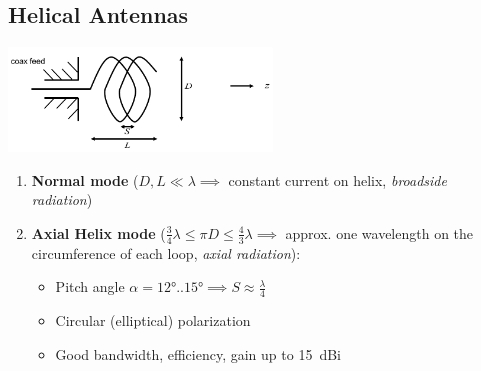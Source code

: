 \subsection{Helical Antennas}
\includegraphics[width=7cm]{content/aawp/pictures/helical_antenna.png}\\
\begin{enumerate}
    \item \textbf{Normal mode} (\(D, L \ll \lambda \implies\) constant current on helix, \textit{broadside radiation})
    \item \textbf{Axial Helix mode} (\(\frac{3}{4}\lambda \leq \pi D \leq \frac{4}{3}\lambda \implies\) approx. one wavelength on the circumference of each loop, \textit{axial radiation}):
        \begin{itemize}
            \itemsep0pt
            \item Pitch angle \(\alpha = \ang{12}..\ang{15} \implies S \approx \frac{\lambda}{4}\)
            \item Circular (elliptical) polarization
            \item Good bandwidth, efficiency, gain up to \SI{15}{dBi}
        \end{itemize}
\end{enumerate}
